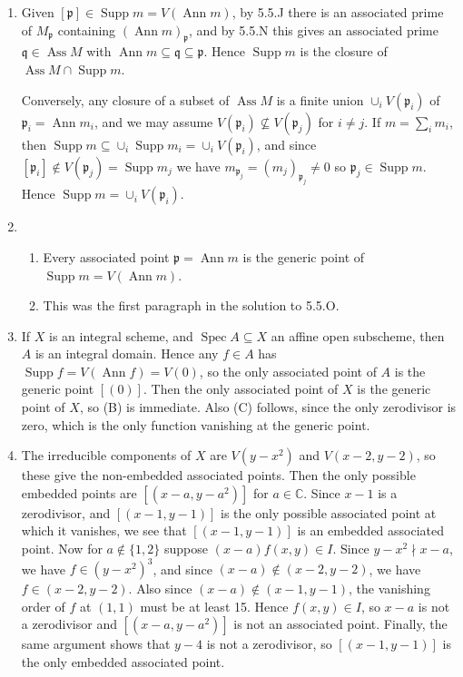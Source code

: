 \documentclass{report}
\newcommand{\ndivides}{\mathrel{\nmid}} %
\newcommand{\p}{\mathfrak{p}}
\newcommand{\q}{\mathfrak{q}}
\newcommand{\C}{\mathbb{C}}
\DeclareMathOperator{\Supp}{Supp}
\DeclareMathOperator{\Spec}{Spec}
\DeclareMathOperator{\Ann}{Ann}
\DeclareMathOperator{\Ass}{Ass}
\begin{document}
\begin{enumerate}[label=\textbf{5.5.\Alph*.}]
	\item Given $[\p]\in\Supp m=V(\Ann m)$, by 5.5.J there is an associated
	      prime of $M_\p$ containing $(\Ann m)_\p$, and by 5.5.N this gives an
	      associated prime $\q\in\Ass M$ with $\Ann m\subseteq\q\subseteq\p$.
	      Hence $\Supp m$ is the closure of $\Ass M\cap\Supp m$.

	      Conversely, any closure of a subset of $\Ass M$ is a finite union
	      $\cup_iV(\p_i)$ of $\p_i=\Ann m_i$, and we may assume
	      $V(\p_i)\not\subseteq V(\p_j)$ for $i\ne j$. If $m=\sum_im_i$, then
	      $\Supp m\subseteq\cup_i\Supp m_i=\cup_iV(\p_i)$, and since
	      $[\p_i]\notin V(\p_j)=\Supp m_j$ we have $m_{\p_j}=(m_j)_{\p_j}\ne0$
	      so $\p_j\in\Supp m$. Hence $\Supp m=\cup_iV(\p_i)$.

	\item
	      \begin{enumerate}[label=(\alph*)]
		      \item Every associated point $\p=\Ann m$ is the generic point of
		            $\Supp m=V(\Ann m)$.

		      \item This was the first paragraph in the solution to 5.5.O.
	      \end{enumerate}

	\item If $X$ is an integral scheme, and $\Spec A\subseteq X$ an affine
	      open subscheme, then $A$ is an integral domain. Hence any $f\in A$ has
	      $\Supp f=V(\Ann f)=V(0)$, so the only associated point of $A$ is the
	      generic point $[(0)]$. Then the only associated point of $X$ is the
	      generic point of $X$, so (B) is immediate. Also (C) follows, since the
	      only zerodivisor is zero, which is the only function vanishing at the
	      generic point.

	\item The irreducible components of $X$ are $V(y-x^2)$ and $V(x-2,y-2)$,
	      so these give the non-embedded associated points. Then the only
	      possible embedded points are $[(x-a,y-a^2)]$ for $a\in\C$. Since $x-1$
	      is a zerodivisor, and $[(x-1,y-1)]$ is the only possible associated
	      point at which it vanishes, we see that $[(x-1,y-1)]$ is an embedded
	      associated point. Now for $a\notin\{1,2\}$ suppose $(x-a)f(x,y)\in I$.
	      Since $y-x^2\ndivides x-a$, we have $f\in(y-x^2)^3$, and since
	      $(x-a)\notin(x-2,y-2)$, we have $f\in(x-2,y-2)$. Also since
	      $(x-a)\notin(x-1,y-1)$, the vanishing order of $f$ at $(1,1)$ must be
	      at least 15. Hence $f(x,y)\in I$, so $x-a$ is not a zerodivisor and
	      $[(x-a,y-a^2)]$ is not an associated point. Finally, the same argument
	      shows that $y-4$ is not a zerodivisor, so $[(x-1,y-1)]$ is the only
	      embedded associated point.
\end{enumerate}
\end{document}
